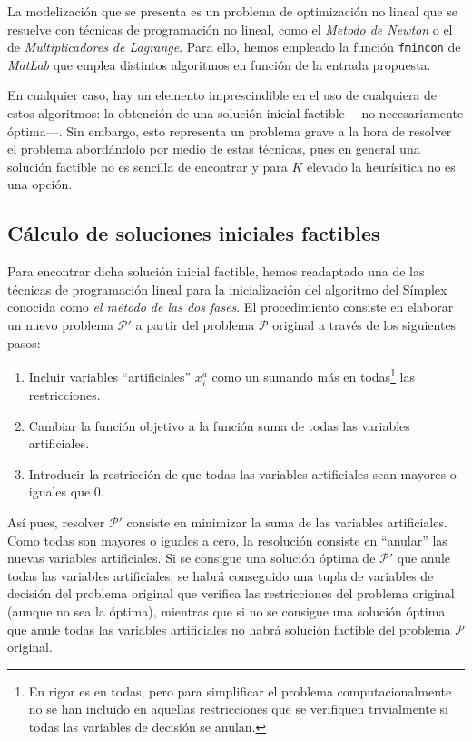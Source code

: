 \documentclass[10pt,a4paper]{article}
\begin{document}
La modelización que se presenta es un problema de optimización no lineal que se resuelve con técnicas de programación no lineal, como el \textit{Metodo de Newton} o el de \textit{Multiplicadores de Lagrange}. Para ello, hemos empleado la función \texttt{fmincon} de \textit{MatLab} que emplea distintos algoritmos en función de la entrada propuesta.

En cualquier caso, hay un elemento imprescindible en el uso de cualquiera de estos algoritmos: la obtención de una solución inicial factible ---no necesariamente óptima---. Sin embargo, esto representa un problema grave a la hora de resolver el problema abordándolo por medio de estas técnicas, pues en general una solución factible no es sencilla de encontrar y para $K$ elevado la heurísitica no es una opción.

\subsection{Cálculo de soluciones iniciales factibles}
Para encontrar dicha solución inicial factible, hemos readaptado una de las técnicas de programación lineal para la inicialización del algoritmo del Símplex conocida como \textit{el método de las dos fases}. El procedimiento consiste en elaborar un nuevo problema $\mathcal{P}'$ a partir del problema $\mathcal{P}$ original a través de los siguientes pasos: 
\begin{enumerate}
\item Incluir variables ``artificiales'' $x_i^a$ como un sumando más en todas\footnote{En rigor es en todas, pero para simplificar el problema computacionalmente no se han incluido en aquellas restricciones que se verifiquen trivialmente si todas las variables de decisión se anulan.} las restricciones.
\item Cambiar la función objetivo a la función suma de todas las variables artificiales.
\item Introducir la restricción de que todas las variables artificiales sean mayores o iguales que 0.
\end{enumerate}

Así pues, resolver $\mathcal{P'}$ consiste en minimizar la suma de las variables artificiales. Como todas son mayores o iguales a cero, la resolución consiste en ``anular'' las nuevas variables artificiales. Si se consigue una solución óptima de $\mathcal{P'}$ que anule todas las variables artificiales, se habrá conseguido una tupla de variables de decisión del problema original que verifica las restricciones del problema original (aunque no sea la óptima), mientras que si no se consigue una solución óptima que anule todas las variables artificiales no habrá solución factible del problema $\mathcal{P}$ original.
\end{document}
